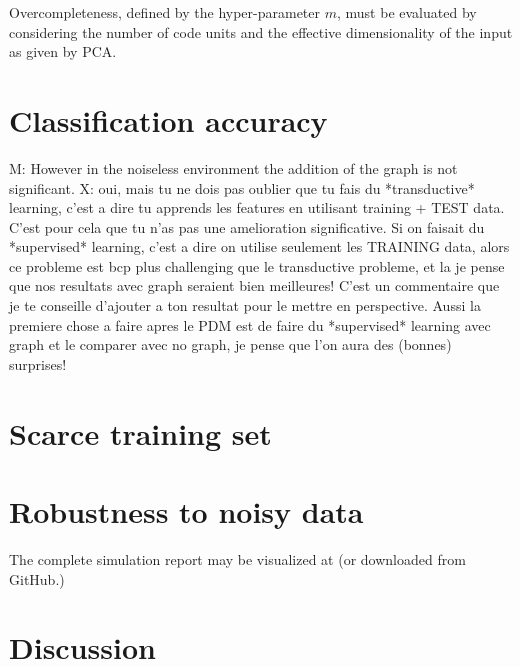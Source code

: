 Overcompleteness, defined by the hyper-parameter $m$, must be evaluated by considering the number of code units and the effective dimensionality of the input as given by \gls{PCA}.

\section{Classification accuracy}

M: However in the noiseless environment the addition of the graph is not significant.
X: oui, mais tu ne dois pas oublier que tu fais du *transductive* learning, c'est a dire tu apprends les features en utilisant training + TEST data. C'est pour cela que tu n'as pas une amelioration significative. Si on faisait du *supervised* learning, c'est a dire on utilise seulement les TRAINING data, alors ce probleme est bcp plus challenging que le transductive probleme, et la je pense que nos resultats avec graph seraient bien meilleures! C'est un commentaire que je te conseille d'ajouter a ton resultat pour le mettre en perspective. Aussi la premiere chose a faire apres le PDM est de faire du *supervised* learning avec graph et le comparer avec no graph, je pense que l'on aura des (bonnes) surprises!


\section{Scarce training set}

\section{Robustness to noisy data}

The complete simulation report may be visualized at (or downloaded from GitHub.)

\section{Discussion}

